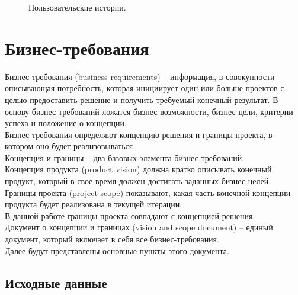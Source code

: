 \documentclass[a4paper,14pt]{extreport} %
\begin{document}
\begin{figure}[H]
\caption{Пользовательские истории.}
\label{user-stories}
\end{figure}

\newpage
\section{Бизнес-требования}

Бизнес-требования (business requirements) -- информация, в совокупности описывающая потребность, которая инициирует один или больше проектов с целью предоставить решение и получить требуемый конечный результат. В основу бизнес-требований ложатся бизнес-возможности, бизнес-цели, критерии успеха и положение о концепции. \\
Бизнес-требования определяют концепцию решения и границы проекта, в котором оно будет реализовываться. \\
Концепция и границы -- два базовых элемента бизнес-требований. \\ Концепция продукта (product vision) должна кратко описывать конечный продукт, который в свое время должен достигать заданных бизнес-целей. \\
Границы проекта (project scope) показывают, какая часть конечной концепции продукта будет реализована в текущей итерации. \\
В данной работе границы проекта совпадают с концепцией решения. \\
Документ о концепции и границах (vision and scope document) -- единый документ, который включает в себя все бизнес-требования. \\
Далее будут представлены основные пункты этого документа.

\subsection{Исходные данные}
\end{document}
